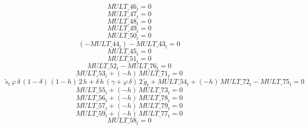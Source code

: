 \begin{dmath}
{MULT\_46}_{t}=0
\end{dmath}
\begin{dmath}
{MULT\_47}_{t}=0
\end{dmath}
\begin{dmath}
{MULT\_48}_{t}=0
\end{dmath}
\begin{dmath}
{MULT\_49}_{t}=0
\end{dmath}
\begin{dmath}
{MULT\_50}_{t}=0
\end{dmath}
\begin{dmath}
\left(-{MULT\_44}_{t}\right)-{MULT\_43}_{t}=0
\end{dmath}
\begin{dmath}
{MULT\_45}_{t}=0
\end{dmath}
\begin{dmath}
{MULT\_51}_{t}=0
\end{dmath}
\begin{dmath}
{MULT\_52}_{t}-{MULT\_76}_{t}=0
\end{dmath}
\begin{dmath}
{MULT\_53}_{t}+\left(-{{h}}\right)\, {MULT\_71}_{t}=0
\end{dmath}
\begin{dmath}
{{\tilde s}}_{t}\, {{\varphi}}\, {{\delta}}\, \left(1-{{\delta}}\right)\, \left(1-{{h}}\right)\, 2\, {{h}}+{{\delta}}\, {{h}}\, \left({{\gamma}}+{{\varphi}}\, {{\delta}}\right)\, 2\, {{\tilde g}}_{t}+{MULT\_54}_{t}+\left(-{{h}}\right)\, {MULT\_72}_{t}-{MULT\_75}_{t}=0
\end{dmath}
\begin{dmath}
{MULT\_55}_{t}+\left(-{{h}}\right)\, {MULT\_73}_{t}=0
\end{dmath}
\begin{dmath}
{MULT\_56}_{t}+\left(-{{h}}\right)\, {MULT\_78}_{t}=0
\end{dmath}
\begin{dmath}
{MULT\_57}_{t}+\left(-{{h}}\right)\, {MULT\_79}_{t}=0
\end{dmath}
\begin{dmath}
{MULT\_59}_{t}+\left(-{{h}}\right)\, {MULT\_77}_{t}=0
\end{dmath}
\begin{dmath}
{MULT\_58}_{t}=0
\end{dmath}
